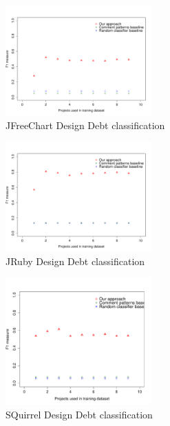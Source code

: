 \begin{figure}[thb!]
  \centering
  \includegraphics[width=0.50\textwidth]{figures/appendix/iteration_details/design_jfreechart.pdf}
  \vspace{-3mm}
  \caption{JFreeChart Design Debt classification}
  \label{fig:design_jfreechart}
\end{figure}

\begin{figure}[thb!]
  \centering
  \includegraphics[width=0.50\textwidth]{figures/appendix/iteration_details/design_jruby.pdf}
  \vspace{-3mm}
  \caption{JRuby Design Debt classification}
  \label{fig:design_jruby}
\end{figure}

\begin{figure}[thb!]
  \centering
  \includegraphics[width=0.50\textwidth]{figures/appendix/iteration_details/design_sql12.pdf}
  \vspace{-3mm}
  \caption{SQuirrel Design Debt classification}
  \label{fig:design_sql}
\end{figure}

